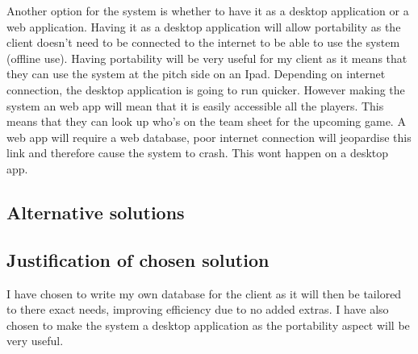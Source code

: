 Another option for the system is whether to have it as a desktop application or a web application. Having it as a desktop application will allow portability as the client doesn't need to be connected to the internet to be able to use the system (offline use). Having portability will be very useful for my client as it means that they can use the system at the pitch side on an Ipad. Depending on internet connection, the desktop application is going to run quicker. However making the system an web app will mean that it is easily accessible all the players. This means that they can look up who's on the team sheet for the upcoming game. A web app will require a web database, poor internet connection will jeopardise this link and therefore cause the system to crash. This wont happen on a desktop app. 
\subsection{Alternative solutions}

\subsection{Justification of chosen solution}
I have chosen to write my own database for the client as it will then be tailored to there exact needs, improving efficiency due to no added extras. I have also chosen to make the system a desktop application as the portability aspect will be very useful.